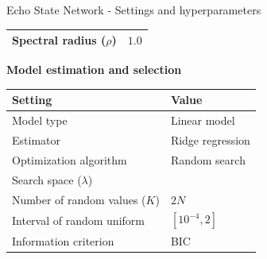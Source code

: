\documentclass[aspectratio=169]{beamer}
\begin{document}
\begin{frame}[t]{Echo State Network  - Settings and hyperparameters}
\begin{minipage}[t]{0.5\textwidth}
\begin{table}[ht]
\begin{tabular}{ll}
				\hspace{2.5mm} Spectral radius ($\rho$)             & $1.0$                            \\
				\bottomrule
				\end{tabular}
			\end{table}
    \end{minipage}%
    \hfill
    \begin{minipage}[t]{0.5\textwidth}
        \vspace{0pt}
        \textbf{Model estimation and selection}
        	\begin{table}[ht]
        	\scriptsize
			\centering
				\begin{tabular}{ll}
				\toprule
				\textbf{Setting}                                  & \textbf{Value}	 \\
				\midrule
				Model type                                        & Linear model	 \\
				Estimator                                         & Ridge regression \\
				Optimization algorithm                            & Random search 	 \\
				Search space ($\lambda$)                          &  				 \\
				\hspace{2.5mm} Number of random values ($K$)      & $2N$             \\
				\hspace{2.5mm} Interval of random uniform         & $[10^{-4}, 2]$   \\
				Information criterion                             & BIC              \\
				\bottomrule
				\end{tabular}
			\end{table}
    \end{minipage}
\end{frame}
\end{document}
